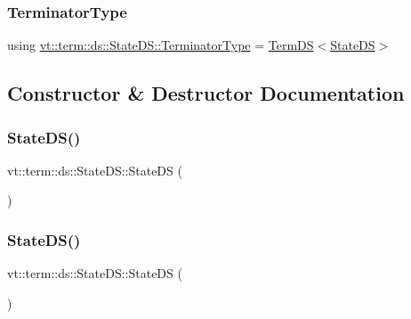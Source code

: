 \subsubsection{\texorpdfstring{Terminator\+Type}{TerminatorType}}
{\footnotesize\ttfamily using \hyperlink{structvt_1_1term_1_1ds_1_1_state_d_s_af98cfe31c25f710273ee103026d538e4}{vt\+::term\+::ds\+::\+State\+D\+S\+::\+Terminator\+Type} =  \hyperlink{structvt_1_1term_1_1ds_1_1_term_d_s}{Term\+DS}$<$\hyperlink{structvt_1_1term_1_1ds_1_1_state_d_s}{State\+DS}$>$}



\subsection{Constructor \& Destructor Documentation}
\mbox{\label{structvt_1_1term_1_1ds_1_1_state_d_s_a8b90d70734aebbe6cbea49fa8fc713f2}} 
\subsubsection{\texorpdfstring{State\+D\+S()}{StateDS()}\hspace{0.1cm}{\footnotesize\ttfamily [1/3]}}
{\footnotesize\ttfamily vt\+::term\+::ds\+::\+State\+D\+S\+::\+State\+DS (\begin{DoxyParamCaption}{ }\end{DoxyParamCaption})\hspace{0.3cm}{\ttfamily [default]}}

\mbox{\label{structvt_1_1term_1_1ds_1_1_state_d_s_aa84d97ee4f2f52142bddb1ec2238a722}} 
\subsubsection{\texorpdfstring{State\+D\+S()}{StateDS()}\hspace{0.1cm}{\footnotesize\ttfamily [2/3]}}
{\footnotesize\ttfamily vt\+::term\+::ds\+::\+State\+D\+S\+::\+State\+DS (\begin{DoxyParamCaption}\item[{\hyperlink{structvt_1_1term_1_1ds_1_1_state_d_s}{State\+DS} \&\&}]{ }\end{DoxyParamCaption})\hspace{0.3cm}{\ttfamily [default]}}

